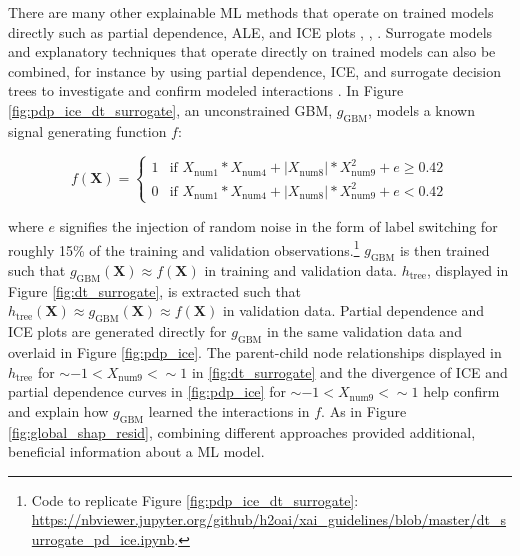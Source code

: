 \documentclass{article}
\newcommand{\twopartdef}[4]
{
	\left\{
		\begin{array}{ll}
			#1 & \mbox{if } #2 \\
			#3 & \mbox{if } #4
		\end{array}
	\right.
}
\begin{document}
There are many other explainable ML methods that operate on trained models directly such as partial dependence, ALE, and ICE plots \cite{ale_plot}, \cite{esl}, \cite{ice_plots}. Surrogate models and explanatory techniques that operate directly on trained models can also be combined, for instance by using partial dependence, ICE, and surrogate decision trees to investigate and confirm modeled interactions \cite{art_and_sci}. In Figure \ref{fig:pdp_ice_dt_surrogate}, an unconstrained GBM, $g_{\text{GBM}}$, models a known signal generating function $f$:

\begin{equation}
\label{eq:f}
f(\mathbf{X}) = \twopartdef {1} {X_{\text{num}1} * X_{\text{num}4} + |X_{\text{num}8}| * X_{\text{num}9}^2 + e \geq 0.42} {0} {X_{\text{num}1} * X_{\text{num}4} + |X_{\text{num}8}| * X_{\text{num}9}^2 + e < 0.42}
\end{equation}

\noindent where $e$ signifies the injection of random noise in the form of label switching for roughly 15\% of the training and validation observations.\footnote{Code to replicate Figure \ref{fig:pdp_ice_dt_surrogate}:  \url{https://nbviewer.jupyter.org/github/h2oai/xai_guidelines/blob/master/dt_surrogate_pd_ice.ipynb}.} $g_{\text{GBM}}$ is then trained such that $g_{\text{GBM}}(\mathbf{X}) \approx f(\mathbf{X})$ in training and validation data. $h_{\text{tree}}$, displayed in Figure \ref{fig:dt_surrogate}, is extracted such that $h_{\text{tree}}(\mathbf{X}) \approx g_{\text{GBM}}(\mathbf{X}) \approx f(\mathbf{X})$ in validation data. Partial dependence and ICE plots are generated directly for $g_{\text{GBM}}$ in the same validation data and overlaid in Figure \ref{fig:pdp_ice}. The parent-child node relationships displayed in $h_{\text{tree}}$ for $\sim -1 < X_{\text{num9}} < \sim 1$ in \ref{fig:dt_surrogate} and the divergence of ICE and partial dependence curves in \ref{fig:pdp_ice} for $\sim -1 < X_{\text{num9}} < \sim 1$ help confirm and explain how $g_{\text{GBM}}$ learned the interactions in $f$. As in Figure \ref{fig:global_shap_resid}, combining different approaches provided additional, beneficial information about a ML model.
\end{document}
